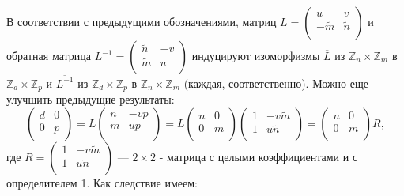 \begin{sled}
В соответствии с предыдущими обозначениями, матриц \linebreak $L = {\left( \begin{array}{ccc}
u & v \\
-\tilde{m} & \tilde{n} \\
\end{array} \right)}$ и обратная матрица $L^{-1} = {\left( \begin{array}{ccc}
\tilde{n} & -v \\
\tilde{m} & u \\
\end{array} \right)}$ индуцируют \linebreak изоморфизмы $\overline{L}$ из $\mathbb{Z}_n \times \mathbb{Z}_m$ в $\mathbb{Z}_d \times \mathbb{Z}_p$ и $\overline{L^{-1}}$ из $\mathbb{Z}_d \times\mathbb{Z}_p$ в $\mathbb{Z}_n \times \mathbb{Z}_m$ \linebreak (каждая, соответственно). 
Можно еще улучшить предыдущие результаты:  
$${\left( \begin{array}{ccc}
d & 0 \\
0 & p \\
\end{array} \right)} = L {\left( \begin{array}{ccc}
n & -vp \\
m & up \\
\end{array} \right)} = L {\left( \begin{array}{ccc}
n & 0 \\
0 & m \\
\end{array} \right)}{\left( \begin{array}{ccc}
1 & -v\tilde{m} \\
1 & u\tilde{n} \\
\end{array} \right)} = {\left( \begin{array}{ccc}
n & 0 \\
0 & m \\
\end{array} \right)}R,$$
где  $R = {\left( \begin{array}{ccc}
1 & -v\tilde{m} \\
1 & u\tilde{n} \\
\end{array} \right)}$ --- $2 \times 2$ - матрица с целыми коэффициентами и с \linebreak определителем 1. Как следствие имеем: 
\end{sled}
